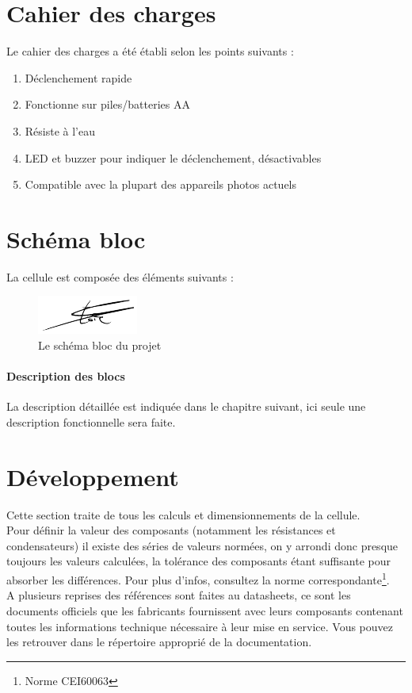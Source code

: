 \documentclass[a4paper,10pt]{article}
\begin{document}
  \section{Cahier des charges}
  Le cahier des charges a été établi selon les points suivants :
  \begin{enumerate}
    \item Déclenchement rapide
    \item Fonctionne sur piles/batteries AA
    \item Résiste à l'eau
    \item LED et buzzer pour indiquer le déclenchement, désactivables
    \item Compatible avec la plupart des appareils photos actuels
    \end{enumerate}  
  
  \section{Schéma bloc}
  La cellule est composée des éléments suivants :  
  
 \begin{figure}[!h]
 \centering
 \includegraphics[scale=0.32]{images/signfracheboud}
 \caption{Le schéma bloc du projet}
 \end{figure}
  \paragraph{Description des blocs}
  La description détaillée est indiquée dans le chapitre suivant, ici seule une description fonctionnelle sera faite.
  
  \pagebreak 
  \section{Développement}
  Cette section traite de tous les calculs et dimensionnements de la cellule.\\
  Pour définir la valeur des composants (notamment les résistances et condensateurs) il existe des séries de valeurs normées, on y arrondi donc presque toujours les valeurs calculées, la tolérance des composants étant suffisante pour absorber les différences. Pour plus d'infos, consultez la norme correspondante\footnote{Norme CEI60063}.\\
  A plusieurs reprises des références sont faites au datasheets, ce sont les documents officiels que les fabricants fournissent avec leurs composants contenant toutes les informations technique nécessaire à leur mise en service. Vous pouvez les retrouver dans le répertoire approprié de la documentation.
\end{document}
